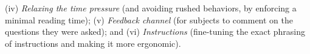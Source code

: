 \documentclass[a4paper,fleqn]{cas-dc}
\begin{document}
{%
(iv)
  \emph{Relaxing the time pressure} (and avoiding rushed behaviors, by enforcing a minimal reading time);
(v)
  \emph{Feedback channel} (for subjects to comment on the
  questions they were asked); and
(vi)  \emph{Instructions} (fine-tuning the exact phrasing of instructions and making it more ergonomic).
}
\end{document}
